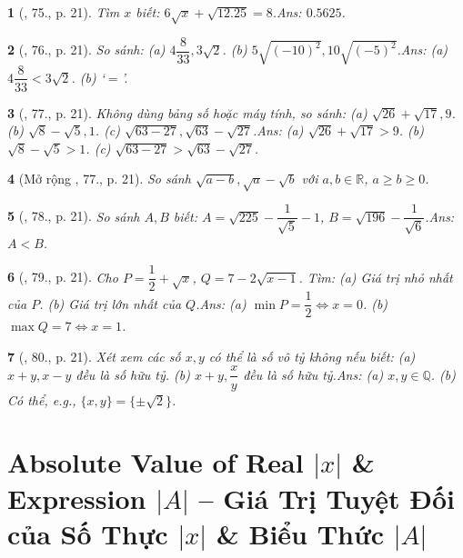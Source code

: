 \documentclass{article}
\newtheorem{baitoan}{}
\begin{document}
\begin{baitoan}[\cite{Tuyen_Toan_7}, 75., p. 21]
	Tìm $x$ biết: $6\sqrt{x} + \sqrt{12.25} = 8$.\hfill{\sf Ans:} $0.5625$.
\end{baitoan}

\begin{baitoan}[\cite{Tuyen_Toan_7}, 76., p. 21]
	So sánh: (a) $4\dfrac{8}{33},3\sqrt{2}$. (b) $5\sqrt{(-10)^2},10\sqrt{(-5)^2}$.\hfill{\sf Ans:} (a) $4\dfrac{8}{33} < 3\sqrt{2}$. (b) `$=$'.
\end{baitoan}

\begin{baitoan}[\cite{Tuyen_Toan_7}, 77., p. 21]
	Không dùng bảng số hoặc máy tính, so sánh: (a) $\sqrt{26} + \sqrt{17},9$. (b) $\sqrt{8} - \sqrt{5},1$. (c) $\sqrt{63 - 27},\sqrt{63} - \sqrt{27}$.\hfill{\sf Ans:} (a) $\sqrt{26} + \sqrt{17} > 9$. (b) $\sqrt{8} - \sqrt{5} > 1$. (c) $\sqrt{63 - 27} > \sqrt{63} - \sqrt{27}$.
\end{baitoan}

\begin{baitoan}[Mở rộng \cite{Tuyen_Toan_7}, 77., p. 21]
	So sánh $\sqrt{a - b},\sqrt{a} - \sqrt{b}$ với $a,b\in\mathbb{R}$, $a\ge b\ge 0$.
\end{baitoan}

\begin{baitoan}[\cite{Tuyen_Toan_7}, 78., p. 21]
	So sánh $A,B$ biết: $A = \sqrt{225} - \dfrac{1}{\sqrt{5}} - 1$, $B = \sqrt{196} - \dfrac{1}{\sqrt{6}}$.\hfill{\sf Ans:} $A < B$.
\end{baitoan}

\begin{baitoan}[\cite{Tuyen_Toan_7}, 79., p. 21]
	Cho $P = \dfrac{1}{2} + \sqrt{x}$, $Q = 7 - 2\sqrt{x - 1}$. Tìm: (a) Giá trị nhỏ nhất của $P$. (b) Giá trị lớn nhất của $Q$.\hfill{\sf Ans:} (a) $\min P = \dfrac{1}{2}\Leftrightarrow x = 0$. (b) $\max Q = 7\Leftrightarrow x = 1$.
\end{baitoan}

\begin{baitoan}[\cite{Tuyen_Toan_7}, 80., p. 21]
	Xét xem các số $x,y$ có thể là số vô tỷ không nếu biết: (a) $x + y,x - y$ đều là số hữu tỷ. (b) $x + y,\dfrac{x}{y}$ đều là số hữu tỷ.\hfill{\sf Ans:} (a) $x,y\in\mathbb{Q}$. (b) Có thể, e.g., $\{x,y\} = \{\pm\sqrt{2}\}$.
\end{baitoan}


\section{Absolute Value of Real $|x|$ \& Expression $|A|$ -- Giá Trị Tuyệt Đối của  Số Thực $|x|$ \& Biểu Thức $|A|$}
\end{document}
